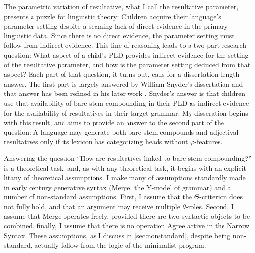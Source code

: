 \documentclass[MilwayThesis]{subfiles}
\begin{document}
The parametric variation of resultative, what I call the resultative parameter, presents a puzzle for linguistic theory:
Children acquire their language's parameter-setting despite a seeming lack of direct evidence in the primary linguistic data.
Since there is no direct evidence, the parameter setting must follow from indirect evidence.
This line of reasoning leads to a two-part research question:
What aspect of a child's PLD provides indirect evidence for the setting of the resultative parameter, and how is the parameter setting deduced from that aspect?
Each part of that question, it turns out, calls for a dissertation-length answer.
The first part is largely answered by William Snyder's dissertation \parencite{snyder1995language} and that answer has been refined in his later work \parencite{snyder2001nature,snyder2012parameter,snyder2016compound}.
Snyder's answer is that children use that availability of bare stem compounding in their PLD as indirect evidence for the availability of resultatives in their target grammar.
My disseration begins with this result, and aims to provide an answer to the second part of the question: 
A language may generate both bare stem compounds and adjectival resultatives only if its lexicon has categorizing heads without $\varphi$-features.

Answering the question ``How are resultatives linked to bare stem compounding?'' is a theoretical task, and, as with any theoretical task, it begins with an explicit litany of theoretical assumptions.
I make many of assumptions standardly made in early  century generative syntax (Merge, the Y-model of grammar) and a number of non-standard assumptions.
First, I assume that the $\Theta$-criterion does not fully hold, and that an argument may receive multiple $\theta$-roles.
Second, I assume that Merge operates freely, provided there are two syntactic objects to be combined.
finally, I assume that there is no operation Agree active in the Narrow Syntax.
These assumptions, as I discuss in \cref{sec:nonstandard}, despite being non-standard, actually follow from the logic of the minimalist program.
\end{document}
